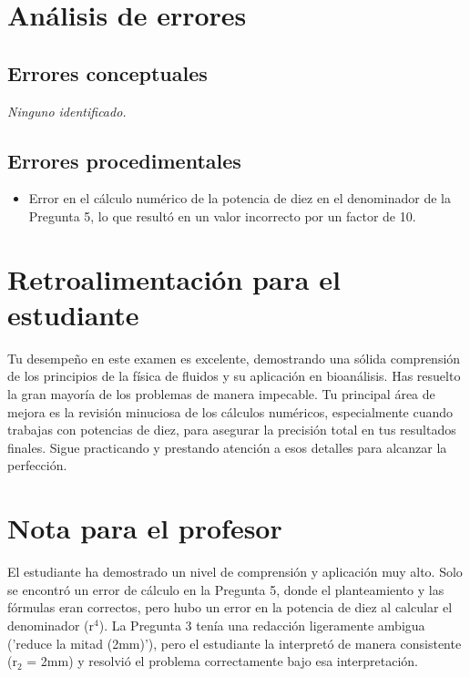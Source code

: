 \documentclass[11pt,a4paper]{article}
\begin{document}
\section*{Análisis de errores}

\subsection*{Errores conceptuales}
\textit{Ninguno identificado.}

\subsection*{Errores procedimentales}
\begin{itemize}[leftmargin=1.5em, itemsep=2pt]
  \item Error en el cálculo numérico de la potencia de diez en el denominador de la Pregunta 5, lo que resultó en un valor incorrecto por un factor de 10.
\end{itemize}

\section*{Retroalimentación para el estudiante}
\begin{tcolorbox}[cajaRecomendacion, title={Dirigido a: daniela vallenilla 32778547}]
Tu desempeño en este examen es excelente, demostrando una sólida comprensión de los principios de la física de fluidos y su aplicación en bioanálisis. Has resuelto la gran mayoría de los problemas de manera impecable. Tu principal área de mejora es la revisión minuciosa de los cálculos numéricos, especialmente cuando trabajas con potencias de diez, para asegurar la precisión total en tus resultados finales. Sigue practicando y prestando atención a esos detalles para alcanzar la perfección.
\end{tcolorbox}

\section*{Nota para el profesor}
\begin{tcolorbox}[
  enhanced, breakable,
  colback=yellow!8, colframe=yellow!60!black,
  fonttitle=\bfseries, coltitle=black,
  title={Observaciones para revisión manual},
  top=4pt, bottom=4pt, left=8pt, right=8pt,
]
El estudiante ha demostrado un nivel de comprensión y aplicación muy alto. Solo se encontró un error de cálculo en la Pregunta 5, donde el planteamiento y las fórmulas eran correctos, pero hubo un error en la potencia de diez al calcular el denominador (r$^{4}$). La Pregunta 3 tenía una redacción ligeramente ambigua ('reduce la mitad (2mm)'), pero el estudiante la interpretó de manera consistente (r$_{2}$ = 2mm) y resolvió el problema correctamente bajo esa interpretación.
\end{tcolorbox}
\end{document}
